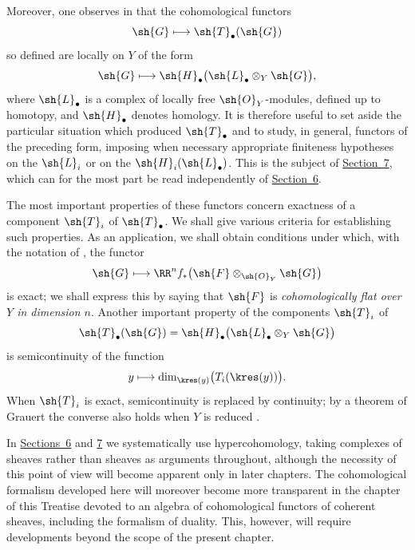 \begin{env}[6.1.2]
\label{III.6.1.2}
Moreover, one observes in  that the cohomological
functors
\[
  \sh{G}\longmapsto\sh{T}_\bullet(\sh{G})
\]
so defined are locally on $Y$ of the form
\[
  \sh{G}\longmapsto
  \sh{H}_\bullet\bigl(\sh{L}_\bullet\otimes_Y\sh{G}\bigr),
\]
where $\sh{L}_\bullet$ is a complex of locally free
$\sh{O}_Y$-modules, defined up to homotopy, and
$\sh{H}_\bullet$ denotes homology.  It is therefore useful to set
aside the particular situation which produced
$\sh{T}_\bullet$ and to study, in general,
functors of the preceding form, imposing when necessary appropriate
finiteness hypotheses on the $\sh{L}_i$ or on the
$\sh{H}_i(\sh{L}_\bullet)$.  This is the subject of \hyperref[section:III.7]{Section~7},
which can for the most part be read independently of \hyperref[section:III.6]{Section~6}.

The most important properties of these functors concern exactness
of a component $\sh{T}_i$ of $\sh{T}_\bullet$.  We shall give
various criteria for establishing such properties.  As an
application, we shall obtain conditions under which, with the
notation of , the functor
\[
  \sh{G}\longmapsto
  \RR^n f_*\bigl(\sh{F}\otimes_{\sh{O}_Y}\sh{G}\bigr)
\]
is exact; we shall express this by saying that $\sh{F}$ is
\emph{cohomologically flat over $Y$ in dimension $n$}.
Another important property of the components $\sh{T}_i$ of
\[
  \sh{T}_\bullet(\sh{G})
  =
  \sh{H}_\bullet\bigl(\sh{L}_\bullet\otimes_Y\sh{G}\bigr)
\]
is semicontinuity of the function
\[
  y\longmapsto
  \dim_{\kres(y)}\bigl(T_i(\kres(y))\bigr).
\]
When $\sh{T}_i$ is exact, semicontinuity is replaced by continuity;
by a theorem of Grauert the converse also holds when $Y$ is reduced
.
\end{env}

\begin{env}[6.1.3]
\label{III.6.1.3}
In \hyperref[section:III.6]{Sections~6} and \hyperref[section:III.7]{7} we systematically use hypercohomology, taking
complexes of sheaves rather than sheaves as arguments throughout,
although the necessity of this point of view will become apparent
only in later chapters.  The cohomological formalism developed here
will moreover become more transparent in the chapter of this
Treatise devoted to an algebra of cohomological functors of coherent
sheaves, including the formalism of duality.  This, however, will
require developments beyond the scope of the present chapter.
\end{env}

